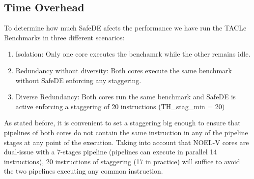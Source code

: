 
\bigskip



\subsection{Time Overhead}

To determine how much SafeDE afects the performance we have run the TACLe Benchmarks in three different scenarios:

\begin{enumerate}
    \item Isolation: Only one core executes the benchamrk while the other remains idle.
    \item Redundancy without diversity: Both cores execute the same benchmark without SafeDE enforcing any staggering. 
    \item Diverse Redundancy: Both cores run the same benchmark and SafeDE is active enforcing a staggering of 20 instructions (TH\_stag\_min = 20)
\end{enumerate}

As stated before, it is convenient to set a staggering big enough to ensure that pipelines of both cores do not contain the same instruction in any of the pipeline stages at any point of the execution. Taking into account that NOEL-V cores are dual-issue with a 7-stages pipeline (pipelines can execute in parallel 14 instructions), 20 instructions of staggering (17 in practice) will suffice to avoid the two pipelines executing any common instruction. 

